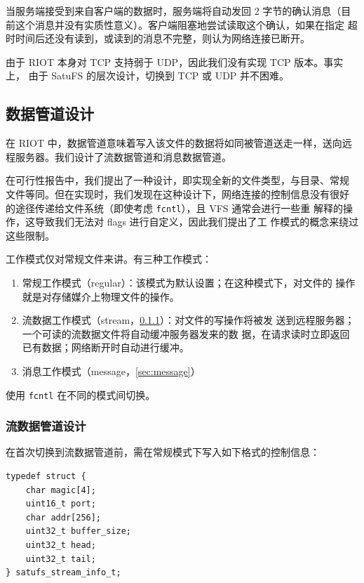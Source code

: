 \documentclass{ctexart}
\begin{document}
当服务端接受到来自客户端的数据时，服务端将自动发回 2 字节的确认消息（目
前这个消息并没有实质性意义）。客户端阻塞地尝试读取这个确认，如果在指定
超时时间后还没有读到，或读到的消息不完整，则认为网络连接已断开。

由于 RIOT 本身对 TCP 支持弱于 UDP，因此我们没有实现 TCP 版本。事实上，
由于 SatuFS 的层次设计，切换到 TCP 或 UDP 并不困难。

\subsection{数据管道设计}
\label{sec:pipe}

在 RIOT 中，数据管道意味着写入该文件的数据将如同被管道送走一样，送向远
程服务器。我们设计了流数据管道和消息数据管道。

在可行性报告中，我们提出了一种设计，即实现全新的文件类型，与目录、常规
文件等同。但在实现时，我们发现在这种设计下，网络连接的控制信息没有很好
的途径传递给文件系统（即使考虑 \verb|fcntl|），且 VFS 通常会进行一些重
解释的操作，这导致我们无法对 flags 进行自定义，因此我们提出了{\heiti 工
  作模式}的概念来绕过这些限制。

工作模式仅对常规文件来讲。有三种工作模式：

\begin{enumerate}
\item 常规工作模式（regular）：该模式为默认设置；在这种模式下，对文件的
  操作就是对存储媒介上物理文件的操作。
\item 流数据工作模式（stream，\ref{sec:stream}）：对文件的写操作将被发
  送到远程服务器；{\kaishu 一个可读的流数据文件将自动缓冲服务器发来的数
    据，在请求读时立即返回已有数据}；网络断开时自动进行缓冲。
\item {\kaishu 消息工作模式（message，\ref{sec:message}）}
\end{enumerate}

使用 \verb|fcntl| 在不同的模式间切换。


\subsubsection{流数据管道设计}
\label{sec:stream}

在首次切换到流数据管道前，需在常规模式下写入如下格式的控制信息：

\begin{verbatim}
typedef struct {
    char magic[4];
    uint16_t port;
    char addr[256];
    uint32_t buffer_size;
    uint32_t head;
    uint32_t tail;
} satufs_stream_info_t;
\end{verbatim}
\end{document}
